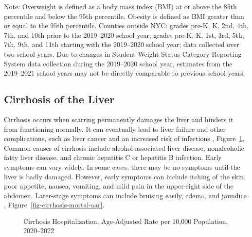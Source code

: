 \documentclass[
  english,
  letterpaper,
]{report}
\begin{document}
\begin{tcolorbox}[enhanced jigsaw, breakable, leftrule=.75mm, title=\textcolor{quarto-callout-note-color}{\faInfo}\hspace{0.5em}{Note}, bottomrule=.15mm, opacityback=0, left=2mm, colback=white, bottomtitle=1mm, coltitle=black, colbacktitle=quarto-callout-note-color!10!white, colframe=quarto-callout-note-color-frame, opacitybacktitle=0.6, toptitle=1mm, titlerule=0mm, arc=.35mm, rightrule=.15mm, toprule=.15mm]

Note: Overweight is defined as a body mass index (BMI) at or above the
85th percentile and below the 95th percentile. Obesity is defined as BMI
greater than or equal to the 95th percentile. Counties outside NYC:
grades pre-K, K, 2nd, 4th, 7th, and 10th prior to the 2019--2020 school
year; grades pre-K, K, 1st, 3rd, 5th, 7th, 9th, and 11th starting with
the 2019--2020 school year; data collected over two school years. Due to
changes in Student Weight Status Category Reporting System data
collection during the 2019--2020 school year, estimates from the
2019--2021 school years may not be directly comparable to previous
school years.

\end{tcolorbox}

\subsection{Cirrhosis of the Liver}\label{cirrhosis-of-the-liver}

Cirrhosis occurs when scarring permanently damages the liver and hinders
it from functioning normally. It can eventually lead to liver failure
and other complications, such as liver cancer and an increased risk of
infections , Figure~\ref{fig-cirrhosis-hospital-aar}. Common causes of
cirrhosis include alcohol-associated liver disease, nonalcoholic fatty
liver disease, and chronic hepatitis C or hepatitis B infection. Early
symptoms can vary widely. In some cases, there may be no symptoms until
the liver is badly damaged. However, early symptoms can include itching
of the skin, poor appetite, nausea, vomiting, and mild pain in the
upper-right side of the abdomen. Later-stage symptoms can include
bruising easily, edema, and jaundice
, Figure~\ref{fig-cirrhosis-mortal-aar}.

\begin{figure}


\caption{\label{fig-cirrhosis-hospital-aar}Cirrhosis Hospitalization,
Age-Adjusted Rate per 10,000 Population, 2020--2022}

\end{figure}%
\end{document}
